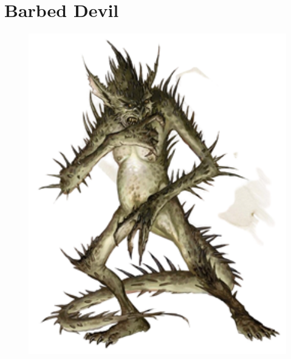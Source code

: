 \documentclass[oneside]{clgrammar}
\begin{document}
\section{Barbed Devil}
\begin{figure}[h!]
\centering
\includegraphics[width=350pt]{images/monstros/barbed_devil-removebg-preview.png}
\end{figure}

\newpage
\end{document}
